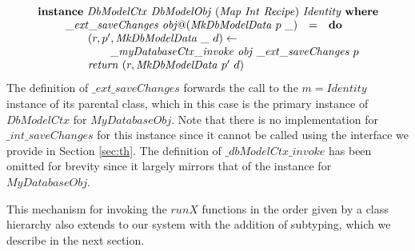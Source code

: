 \begin{displaymath}
\begin{array}{l}
\mathbf{instance}~\mathit{DbModelCtx}~\mathit{DbModelObj}~(\mathit{Map}~\mathit{Int}~\mathit{Recipe})~\mathit{Identity}~\mathbf{where}\\
\qquad \begin{array}{lcl}

\mathit{\_ext\_saveChanges}~\mathit{obj}@(\mathit{MkDbModelData}~p~\_) & = & \mathbf{do} \\
\multicolumn{3}{l}{\qquad (r,p',\mathit{MkDbModelData}~\_~d) \leftarrow} \\
\multicolumn{3}{l}{\qquad \qquad \mathit{\_myDatabaseCtx\_invoke}~\mathit{obj}~\mathit{\_ext\_saveChanges}~p} \\
\multicolumn{3}{l}{\qquad \mathit{return}~(r,\mathit{MkDbModelData}~p'~d)}
\end{array}
\end{array}
\end{displaymath}
The definition of $\_\mathit{ext}\_\mathit{saveChanges}$ forwards the call to the $m = \mathit{Identity}$ instance of its parental class, which in this case is the primary instance of $\mathit{DbModelCtx}$ for $\mathit{MyDatabaseObj}$. Note that there is no implementation for $\_\mathit{int}\_\mathit{saveChanges}$ for this instance since it cannot be called using the interface we provide in Section \ref{sec:th}. The definition of $\_\mathit{dbModelCtx}\_\mathit{invoke}$ has been omitted for brevity since it largely mirrors that of the instance for $\mathit{MyDatabaseObj}$.

This mechanism for invoking the $\mathit{runX}$ functions in the order given by a class hierarchy also extends to our system with the addition of subtyping, which we describe in the next section.
